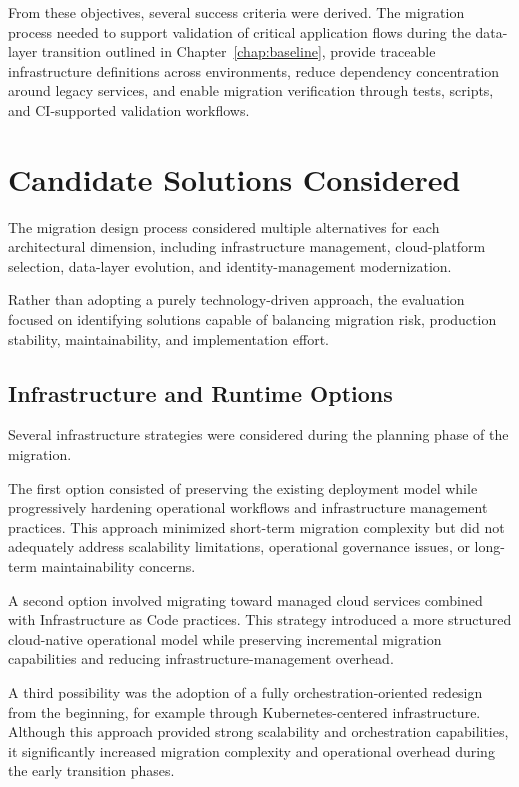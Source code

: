From these objectives, several success criteria were derived. The migration process needed to support validation of critical application flows during the data-layer transition outlined in Chapter~\ref{chap:baseline}, provide traceable infrastructure definitions across environments, reduce dependency concentration around legacy services, and enable migration verification through tests, scripts, and CI-supported validation workflows.

\section{Candidate Solutions Considered}
The migration design process considered multiple alternatives for each architectural dimension, including infrastructure management, cloud-platform selection, data-layer evolution, and identity-management modernization.

Rather than adopting a purely technology-driven approach, the evaluation focused on identifying solutions capable of balancing migration risk, production stability, maintainability, and implementation effort.

\subsection{Infrastructure and Runtime Options}
\label{sec:runtime-options}
Several infrastructure strategies were considered during the planning phase of the migration.

The first option consisted of preserving the existing deployment model while progressively hardening operational workflows and infrastructure management practices. This approach minimized short-term migration complexity but did not adequately address scalability limitations, operational governance issues, or long-term maintainability concerns.

A second option involved migrating toward managed cloud services combined with Infrastructure as Code practices. This strategy introduced a more structured cloud-native operational model while preserving incremental migration capabilities and reducing infrastructure-management overhead.

A third possibility was the adoption of a fully orchestration-oriented redesign from the beginning, for example through Kubernetes-centered infrastructure. Although this approach provided strong scalability and orchestration capabilities, it significantly increased migration complexity and operational overhead during the early transition phases.


